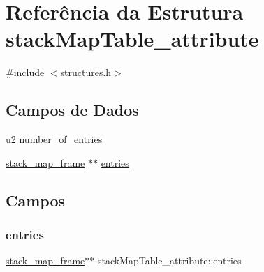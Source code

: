 \hypertarget{structstackMapTable__attribute}{}\section{Referência da Estrutura stack\+Map\+Table\+\_\+attribute}
\label{structstackMapTable__attribute}


{\ttfamily \#include $<$structures.\+h$>$}

\subsection*{Campos de Dados}
\begin{DoxyCompactItemize}
\item 
\hyperlink{lista__operandos_8h_a732cde1300aafb73b0ea6c2558a7a54f}{u2} \hyperlink{structstackMapTable__attribute_a3bccf778bae6ecac485fb942eb82a478}{number\+\_\+of\+\_\+entries}
\item 
\hyperlink{structstack__map__frame}{stack\+\_\+map\+\_\+frame} $\ast$$\ast$ \hyperlink{structstackMapTable__attribute_a064170c738925362875e3337defc60d0}{entries}
\end{DoxyCompactItemize}


\subsection{Campos}
\mbox{\label{structstackMapTable__attribute_a064170c738925362875e3337defc60d0}} 
\subsubsection{\texorpdfstring{entries}{entries}}
{\footnotesize\ttfamily \hyperlink{structstack__map__frame}{stack\+\_\+map\+\_\+frame}$\ast$$\ast$ stack\+Map\+Table\+\_\+attribute\+::entries}

\mbox{\label{structstackMapTable__attribute_a3bccf778bae6ecac485fb942eb82a478}} 
